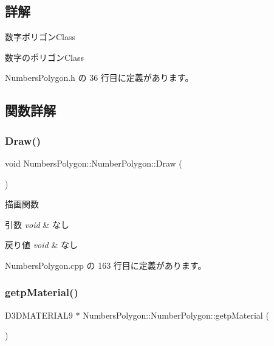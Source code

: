 \subsection{詳解}
数字ポリゴン\+Class 

数字のポリゴン\+Class 

 Numbers\+Polygon.\+h の 36 行目に定義があります。



\subsection{関数詳解}
\mbox{\label{class_numbers_polygon_1_1_number_polygon_a48c8dd4a526a9bb0d657effa3bc471db}} 
\subsubsection{\texorpdfstring{Draw()}{Draw()}}
{\footnotesize\ttfamily void Numbers\+Polygon\+::\+Number\+Polygon\+::\+Draw (\begin{DoxyParamCaption}{ }\end{DoxyParamCaption})}



描画関数 


\begin{DoxyParams}{引数}
{\em void} & なし \\
\hline
\end{DoxyParams}

\begin{DoxyRetVals}{戻り値}
{\em void} & なし \\
\hline
\end{DoxyRetVals}


 Numbers\+Polygon.\+cpp の 163 行目に定義があります。

\mbox{\label{class_numbers_polygon_1_1_number_polygon_a1e7a8d196f26c95461e99f393667f300}} 
\subsubsection{\texorpdfstring{getp\+Material()}{getpMaterial()}}
{\footnotesize\ttfamily D3\+D\+M\+A\+T\+E\+R\+I\+A\+L9 $\ast$ Numbers\+Polygon\+::\+Number\+Polygon\+::getp\+Material (\begin{DoxyParamCaption}{ }\end{DoxyParamCaption})}



